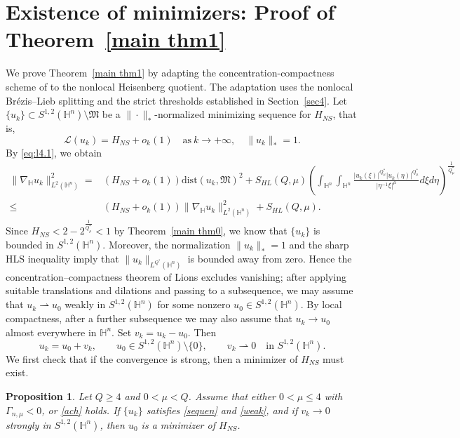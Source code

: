 \documentclass[11pt]{article}
\newtheorem{proposition}{Proposition}[section]
\begin{document}
\section{Existence of minimizers: Proof of Theorem~\ref{main thm1}}\label{sec5}
We prove Theorem~\ref{main thm1} by adapting the concentration-compactness scheme of \cite{K25} to the nonlocal Heisenberg quotient. The adaptation uses the nonlocal Br\'{e}zis--Lieb splitting and the strict thresholds established in Section~\ref{sec4}.
Let $\{u_k\}\subset S^{1,2}(\mathbb{H}^{n})\setminus \mathfrak{M}$ be a $\|\cdot\|_*$-normalized minimizing sequence for $H_{NS}$, that is,
 \begin{equation}\label{sequen}
 \mathcal {L}(u_k)=H_{NS}+o_k(1)\quad \mathrm{as}~k\rightarrow+\infty,\quad \|u_k\|_*=1.
 \end{equation}
{By \eqref{eq:l4.1}, we obtain}
\begin{align*}
 \|\nabla_\mathbb{H} u_k\|_{L^2(\mathbb{H}^n)}^2=&(H_{NS}+o_k(1))\mathrm{dist}(u_k,\mathfrak{M})^2+S_{HL}(Q,\mu) \left(\int_{\mathbb{H}^{n}}\int_{\mathbb{H}^{n}}\frac{|u_k(\xi)|^{Q^{\ast}_{\mu}}|u_k(\eta)|
^{Q^{\ast}_{\mu}}}{|\eta^{-1}\xi|^{\mu}}{d}\xi{d}\eta\right)^{\frac{1}{Q^{\ast}_{\mu}}}\\
\leq&
 (H_{NS}+o_k(1))\|\nabla_\mathbb{H} u_k\|_{L^2(\mathbb{H}^n)}^2+S_{HL}(Q,\mu).
\end{align*}
Since $H_{NS}<2-2^{\frac{1}{Q^{\ast}_{\mu}}}<1$ by Theorem~\ref{main thm0}, we know that $\{u_k\}$ is bounded in $S^{1,2}(\mathbb{H}^{n})$. {Moreover, the normalization $\|u_k\|_*=1$ and the sharp HLS inequality imply that $\|u_k\|_{L^{Q^{\ast}}(\mathbb H^n)}$ is bounded away from zero. Hence the concentration--compactness theorem of Lions \cite{L85} excludes vanishing; after applying suitable translations and dilations and passing to a subsequence, we may assume that $u_k\rightharpoonup u_0$ weakly in $S^{1,2}(\mathbb{H}^{n})$ for some nonzero $u_0\in S^{1,2}(\mathbb{H}^{n})$. By local compactness, after a further subsequence we may also assume that $u_k\to u_0$ almost everywhere in $\mathbb H^n$.} {Set $v_k=u_k-u_0$. Then}
\begin{equation}\label{weak}
 {u_k=u_0+v_k,\qquad u_0\in S^{1,2}(\mathbb H^n)\setminus\{0\},\qquad v_k\rightharpoonup0\quad\text{in }S^{1,2}(\mathbb H^n).}
\end{equation}
We first check that if the convergence is strong, then a minimizer of $H_{NS}$ must exist.
\begin{proposition}\label{promini}
Let $Q\geq4$ and $0<\mu<Q$. Assume that either $0<\mu\leq4$ with $\Gamma_{n,\mu}<0$, or \eqref{ach} holds. {If $\{u_k\}$ satisfies \eqref{sequen} and \eqref{weak}, and if $v_k\to0$ strongly in $S^{1,2}(\mathbb{H}^{n})$, then $u_0$ is a minimizer of $H_{NS}$.}
\end{proposition}
\end{document}
